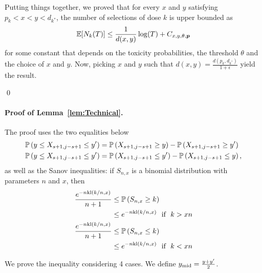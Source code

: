 Putting things together, we proved that for every $x$ and $y$ satisfying $p_k < x < y < d_{k^*}$, the number of selections of dose $k$ is upper bounded as 
\[ \mathbb{E}[N_k(T)] \leq \frac{1}{d(x,y)}\log(T) + C_{x,y,\theta,\bm p}\]
for some constant that depends on the toxicity probabilities, the threshold $\theta$ and the choice of $x$ and $y$. Now, picking $x$ and $y$ such that $d(x,y) = \frac{d(p_k,d_{k^*})}{1+\epsilon}$ yield the result. 

\qed 

\paragraph{Proof of Lemma~\ref{lem:Technical}.} The proof uses the two equalities below
\begin{align}
 \mathbb{P}\left(y \leq X_{s+1,j-s+1} \leq y'\right) & = \mathbb{P}\left(X_{s+1,j-s+1} \geq y\right) - \mathbb{P}\left(X_{s+1,j-s+1} \geq y'\right)\label{ForSmallS}
\\ 
\mathbb{P}\left(y \leq X_{s+1,j-s+1} \leq y'\right)
 & = \mathbb{P}\left(X_{s+1,j-s+1} \leq y'\right) - \mathbb{P}\left(X_{s+1,j-s+1} \leq y\right),\label{ForLargeS}
\end{align}
as well as the Sanov inequalities: if $S_{n,x}$ is a binomial distribution with parameters $n$ and $x$, then 
\begin{align}
\nonumber
\frac{e^{-n\mathrm{kl}(k/n,x)}}{n+1}
& \leq \mathbb{P}\left(S_{n,x} \geq k\right) 
\\ & \leq e^{-n\mathrm{kl}(k/n,x)} \ \ \text{if } \ k > xn \label{Sanov}
\\ \nonumber
\frac{e^{-n\mathrm{kl}(k/n,x)}}{n+1}
& \leq \mathbb{P}\left(S_{n,x} \leq k\right)
\\ & \leq
	e^{-n\mathrm{kl}(k/n,x)} \ \ \text{if } \ k < xn \label{SanovMin}
\end{align}

We prove the inequality considering 4 cases. We define $y_{\mathrm{mid}} = \frac{y+y'}{2}$. 

